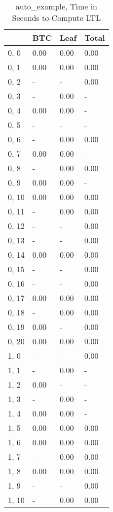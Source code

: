 \begin{table}
\centering
\caption{auto_example, Time in Seconds to Compute LTL}
\label{auto_example_LTL_time}
\begin{tabular}{llll}
\toprule
{} &   BTC &  Leaf & Total \\
\midrule
0, 0   &  0.00 &  0.00 &  0.00 \\
0, 1   &  0.00 &  0.00 &  0.00 \\
0, 2   &     - &     - &  0.00 \\
0, 3   &     - &  0.00 &     - \\
0, 4   &  0.00 &  0.00 &     - \\
0, 5   &     - &     - &     - \\
0, 6   &     - &  0.00 &  0.00 \\
0, 7   &  0.00 &  0.00 &     - \\
0, 8   &     - &  0.00 &  0.00 \\
0, 9   &  0.00 &  0.00 &     - \\
0, 10  &  0.00 &  0.00 &  0.00 \\
0, 11  &     - &  0.00 &  0.00 \\
0, 12  &     - &     - &  0.00 \\
0, 13  &     - &     - &  0.00 \\
0, 14  &  0.00 &  0.00 &  0.00 \\
0, 15  &     - &     - &  0.00 \\
0, 16  &     - &     - &  0.00 \\
0, 17  &  0.00 &  0.00 &  0.00 \\
0, 18  &     - &  0.00 &  0.00 \\
0, 19  &  0.00 &     - &  0.00 \\
0, 20  &  0.00 &  0.00 &  0.00 \\
1, 0   &     - &     - &  0.00 \\
1, 1   &     - &  0.00 &     - \\
1, 2   &  0.00 &     - &     - \\
1, 3   &     - &  0.00 &     - \\
1, 4   &  0.00 &  0.00 &     - \\
1, 5   &  0.00 &  0.00 &  0.00 \\
1, 6   &  0.00 &  0.00 &  0.00 \\
1, 7   &     - &  0.00 &  0.00 \\
1, 8   &  0.00 &  0.00 &  0.00 \\
1, 9   &     - &     - &  0.00 \\
1, 10  &     - &  0.00 &  0.00 \\

\end{tabular}
\end{table}
